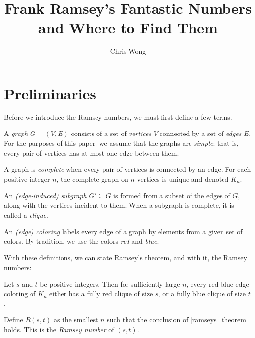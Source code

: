 \documentclass{article}
\begin{document}
\author{Chris Wong}
\title{Frank Ramsey's Fantastic Numbers and Where to Find Them}
\maketitle


\section{Preliminaries}

Before we introduce the Ramsey numbers, we must first define a few terms.

A \textit{graph} $G = (V, E)$ consists of a set of \textit{vertices} $V$ connected by a set of \textit{edges} $E$. For the purposes of this paper, we assume that the graphs are \textit{simple}: that is, every pair of vertices has at most one edge between them.

A graph is \textit{complete} when every pair of vertices is connected by an edge. For each positive integer $n$, the complete graph on $n$ vertices is unique and denoted $K_n$.

An \textit{(edge-induced) subgraph} $G' \subseteq G$ is formed from a subset of the edges of $G$, along with the vertices incident to them. When a subgraph is complete, it is called a \textit{clique}.

An \textit{(edge) coloring} labels every edge of a graph by elements from a given set of colors. By tradition, we use the colors \textit{red} and \textit{blue}.

With these definitions, we can state Ramsey's theorem, and with it, the Ramsey numbers:

\begin{Theorem} \label{ramseys_theorem}
    Let $s$ and $t$ be positive integers. Then for sufficiently large $n$, every red-blue edge coloring of $K_n$ either has a fully red clique of size $s$, or a fully blue clique of size $t$.
\end{Theorem}

\begin{Definition}
    Define $R(s,t)$ as the smallest $n$ such that the conclusion of \cref{ramseys_theorem} holds. This is the \textit{Ramsey number} of $(s,t)$.
\end{Definition}

\end{document}
